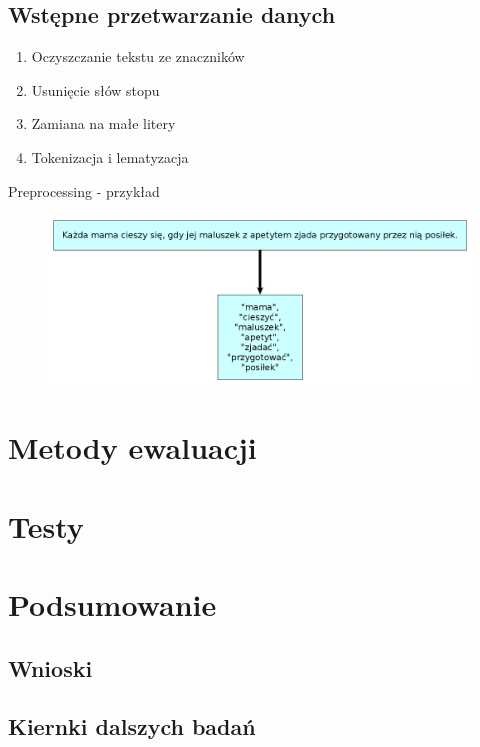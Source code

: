\documentclass{beamer}
\begin{document}
	\subsection{Wstępne przetwarzanie danych}
	\begin{frame}
		\begin{enumerate}
			\item Oczyszczanie tekstu ze znaczników
			\item Usunięcie słów stopu \pause
			\item Zamiana na małe litery \pause
			\item Tokenizacja i lematyzacja %
		\end{enumerate}
	\end{frame}
	\begin{frame}{Preprocessing - przykład}
		\begin{figure}
			\centering
			\includegraphics[width=1\textwidth]{img/lemmatisation.png}
		\end{figure}
	\end{frame}
	\section{Metody ewaluacji}
	
	\section{Testy}
	
	\section{Podsumowanie}
	\subsection{Wnioski}
	\subsection{Kiernki dalszych badań}
\end{document}
